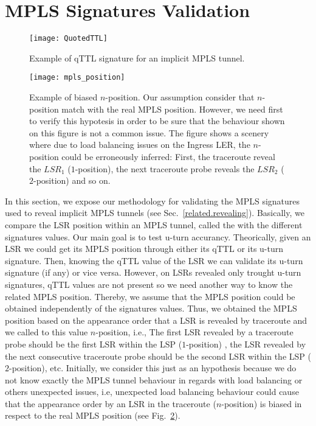 \section{MPLS Signatures Validation}\label{validation}
\begin{figure}[!t]
  \begin{center}
    \texttt{[image: QuotedTTL]}
  \end{center}
  \caption{Example of qTTL signature for an implicit MPLS tunnel.}
  \label{validation.qTTLFig}
\end{figure}

\begin{figure}[!t]
  \begin{center}
    \texttt{[image: mpls\_position]}
  \end{center}
  \caption{Example of biased $n$-position. Our assumption consider that $n$-position match with the real MPLS position. However, we need first to verify this hypotesis in order to be sure that the behaviour shown on this figure is not a common issue. The figure shows a scenery where due to load balancing issues on the Ingress LER, the $n$-position could be erroneously inferred: First, the traceroute reveal the $LSR_{1}$ ($1$-position), the next traceroute probe reveals the $LSR_{2}$ ($2$-position) and so on.}
  \label{validation.MPLSpositionFig}
\end{figure}

In this section, we expose our methodology for validating the MPLS
signatures used to reveal implicit MPLS tunnels (see Sec.~\ref{related.revealing}).
Basically, we compare the LSR position within an MPLS tunnel, called the
 with the different signatures values. Our main goal is to test 
u-turn accurancy. Theorically, given an LSR we could get its MPLS position through 
either its qTTL or its u-turn signature. Then, knowing the qTTL value of the LSR we 
can validate its u-turn signature (if any) or vice versa. However, on LSRs revealed 
only trought u-turn signatures,
qTTL values are not present so we need another way to know the related MPLS position. 
Thereby, we assume that the MPLS position
could be obtained independently of the signatures values. 
Thus, we obtained the MPLS position based on the appearance order that a LSR is 
revealed by traceroute and we called to this value $n$-position, i.e., 
The first LSR revealed by a traceroute probe should be
the first LSR within the LSP ($1$-position) , the LSR revealed by the next 
consecutive traceroute probe should be
the second LSR within the LSP ($2$-position), etc. Initially, we consider 
this just as an hypothesis because we do not know 
exactly the MPLS tunnel behaviour in regards with load balancing or others 
unexpected issues, i.e, unexpected load balancing behaviour could cause 
that the appearance order by an LSR in the traceroute ($n$-position) 
is biased in respect to the real MPLS position (see Fig.~\ref{validation.MPLSpositionFig}).

